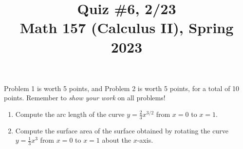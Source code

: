 \documentclass[11pt]{article}
\title{Quiz \#6, 2/23 \\ Math 157 (Calculus II), Spring 2023}
\date{}
\begin{document}
\maketitle

\thispagestyle{empty}

\vspace{-2cm}

Problem 1 is worth 5 points, and Problem 2 is worth 5 points, for a total of 10 points. Remember to \emph{show your work} on all problems!

\begin{enumerate}
\item Compute the arc length of the curve $y= \frac{2}{3} x^{3/2}$ from $x = 0$ to $x=1$.

\vspace{8.25cm}

\item Compute the surface area of the surface obtained by rotating the curve $y=\frac{1}{3}x^3$ from $x = 0$ to $x=1$ about the $x$-axis.

\end{enumerate}
\end{document}
